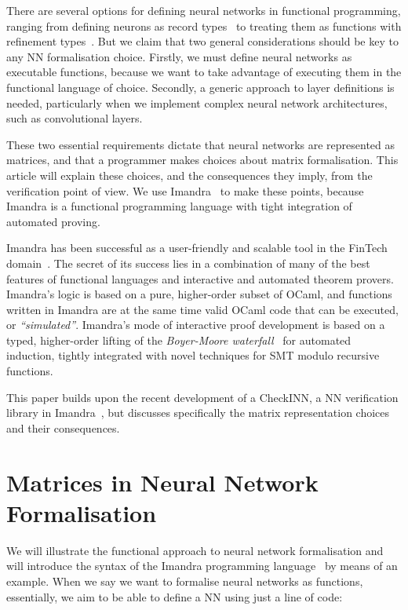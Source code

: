 \documentclass[runningheads]{llncs}
\begin{document}
There are several options for defining neural networks in functional
programming, ranging from defining neurons as record types~\cite{MariaBLFGRG22}
to treating them as functions with refinement types~\cite{KokkeKKAA20}. But we
claim that two general considerations should be key to any NN formalisation
choice. Firstly, we must define neural networks as executable
functions, because we want to take advantage of executing them in the functional
language of choice. Secondly, a generic approach to layer definitions is needed,
particularly when we implement complex neural network architectures, such as
convolutional layers.

These two essential requirements dictate that neural networks are represented as
matrices, and that a programmer makes choices about matrix formalisation. This
article will explain these choices, and the consequences they imply,
from the verification point of view. We use Imandra~\cite{PassmoreCIABKKM20} to
make these points, because Imandra is a functional programming language with
tight integration of automated proving.

Imandra has been successful as a user-friendly and scalable tool in the FinTech
domain~\cite{Passmore21}. The secret of its success lies in a combination of
many of the best features of functional languages and interactive and automated
theorem provers. Imandra's logic is based on a pure, higher-order subset of
OCaml, and functions written in Imandra are at the same time valid OCaml code
that can be executed, or \emph{``simulated''}. Imandra's mode of interactive
proof development is based on a typed, higher-order lifting of the
\emph{Boyer-Moore waterfall}~\cite{BM79} for automated induction, tightly
integrated with novel techniques for SMT modulo recursive functions.

This paper builds upon the recent development of a CheckINN, a NN verification library in Imandra~\cite{DPKD22}, but
discusses specifically the matrix representation choices and their consequences.  


\section{Matrices in Neural Network Formalisation}
We will illustrate the functional approach to neural network formalisation and
will introduce the syntax of the Imandra programming
language~\cite{PassmoreCIABKKM20} by means of an example. When we say we want to
formalise neural networks as functions, essentially, we aim to be able to define
a NN using just a line of code:
\end{document}
